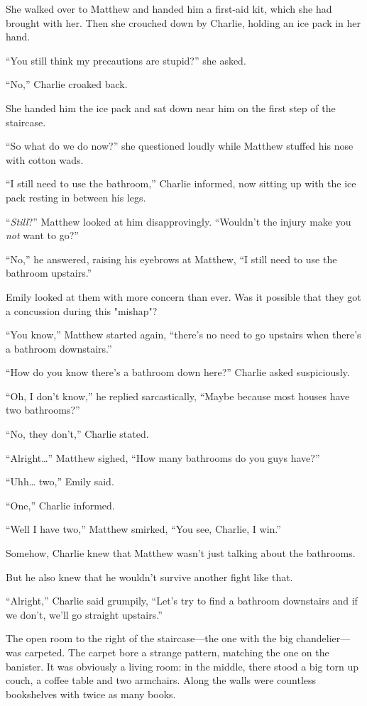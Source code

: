 She walked over to Matthew and handed him a first-aid kit, which she had brought with her. Then she crouched down by Charlie, holding an ice pack in her hand.

“You still think my precautions are stupid?” she asked.

“No,” Charlie croaked back.

She handed him the ice pack and sat down near him on the first step of the staircase.

“So what do we do now?” she questioned loudly while Matthew stuffed his nose with cotton wads.

“I still need to use the bathroom,” Charlie informed, now sitting up with the ice pack resting in between his legs.

“\textit{Still}?” Matthew looked at him disapprovingly. “Wouldn't the injury make you \textit{not} want to go?”

“No,” he answered, raising his eyebrows at Matthew, “I still need to use the bathroom upstairs.”

Emily looked at them with more concern than ever. Was it possible that they got a concussion during this "mishap"?

“You know,” Matthew started again, “there's no need to go upstairs when there's a bathroom downstairs.”

“How do you know there's a bathroom down here?” Charlie asked suspiciously.

“Oh, I don't know,” he replied sarcastically, “Maybe because most houses have two bathrooms?”

“No, they don't,” Charlie stated.

“Alright…” Matthew sighed, “How many bathrooms do you guys have?”

“Uhh… two,” Emily said.

“One,” Charlie informed.

“Well I have two,” Matthew smirked, “You see, Charlie, I win.”

Somehow, Charlie knew that Matthew wasn't just talking about the bathrooms.

But he also knew that he wouldn't survive another fight like that.

“Alright,” Charlie said grumpily, “Let's try to find a bathroom downstairs and if we don't, we'll go straight upstairs.”

\bigskip

The open room to the right of the staircase—the one with the big chandelier—was carpeted. The carpet bore a strange pattern, matching the one on the banister. It was obviously a living room: in the middle, there stood a big torn up couch, a coffee table and two armchairs. Along the walls were countless bookshelves with twice as many books.


